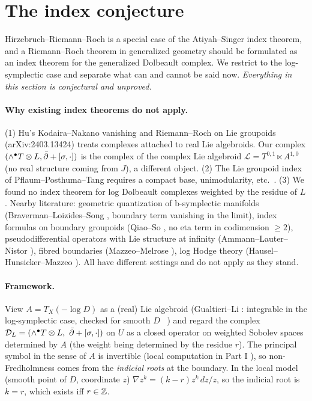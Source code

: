 \section{The index conjecture}\label{p5:sec:index}
Hirzebruch--Riemann--Roch is a special case of the Atiyah--Singer index theorem, and a Riemann--Roch theorem in generalized geometry should be formulated as an index theorem for the generalized Dolbeault complex. We restrict to the log-symplectic case and separate what can and cannot be said now. \emph{Everything in this section is conjectural and unproved.}

\paragraph{Why existing index theorems do not apply.} (1) Hu's Kodaira--Nakano vanishing and Riemann--Roch on Lie groupoids (arXiv:2403.13424) \cite{Hu2} treats complexes attached to real Lie algebroids. Our complex $(\wedge^\bullet T\otimes L,\bar\partial+[\sigma,\cdot])$ is the complex of the complex Lie algebroid $\mathcal L=T^{0,1}\ltimes A^{1,0}$ (no real structure coming from $J$), a different object. (2) The Lie groupoid index of Pflaum--Posthuma--Tang \cite{PPT} requires a compact base, unimodularity, etc.\ \tQ. (3) We found no index theorem for log Dolbeault complexes weighted by the residue of $L$. Nearby literature: geometric quantization of b-symplectic manifolds (Braverman--Loizides--Song \cite{BLS}, boundary term vanishing in the limit), index formulas on boundary groupoids (Qiao--So \cite{QS}, no eta term in codimension $\ge2$), pseudodifferential operators with Lie structure at infinity (Ammann--Lauter--Nistor \cite{ALN}), fibred boundaries (Mazzeo--Melrose \cite{MM}), log Hodge theory (Hausel--Hunsicker--Mazzeo \cite{HHM}). All have different settings and do not apply as they stand.

\paragraph{Framework.} View $A=T_X(-\log D)$ as a (real) Lie algebroid (Gualtieri--Li \cite{GL}: integrable in the log-symplectic case, checked for smooth $D$ \tC\ \tQ) and regard the complex $\mathcal D_L=(\wedge^\bullet T\otimes L,\ \bar\partial+[\sigma,\cdot])$ on $U$ as a closed operator on weighted Sobolev spaces determined by $A$ (the weight being determined by the residue $r$). The principal symbol in the sense of $A$ is invertible (local computation in Part I \tV), so non-Fredholmness comes from the \emph{indicial roots} at the boundary. In the local model (smooth point of $D$, coordinate $z$) $\nabla z^k=(k-r)z^k\,dz/z$, so the indicial root is $k=r$, which exists iff $r\in\mathbb Z$.

